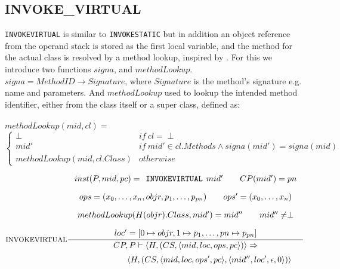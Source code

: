 \subsection{INVOKE\_VIRTUAL}
\label{app:invokevirtual}
\texttt{INVOKEVIRTUAL} is similar to \texttt{INVOKESTATIC} but in addition an object reference from the operand stack is stored as the first local variable, and the method for the actual class is resolved by a method lookup, inspired by \cite{dalvik}. For this we introduce two functions $signa$, and $methodLookup$. $signa = MethodID \to Signature$, where $Signature$ is the method's signature e.g. name and parameters. And $methodLookup$ used to lookup the intended method identifier, either from the class itself or a super class, defined as: \\\\
$methodLookup(mid, cl) = $ \vspace{-10px}
\[
\begin{cases}
  \perp & if\ cl = \perp \\
  mid'  & if\ mid' \in cl.Methods \wedge signa(mid') = signa (mid)  \\
  methodLookup(mid, cl.Class) & otherwise
\end{cases}
\]


$$\inference[INVOKEVIRTUAL]{
inst(P,mid,pc) = \texttt{INVOKEVIRTUAL }mid' \semsp 
CP(mid') = pn \semnl \\
ops = (x_0, \ldots, x_n, objr, p_1, \ldots, p_{pn}) \semsp
ops' = (x_0, \ldots, x_{n}) \semnl\\ 
methodLookup(H(objr).Class, mid') = mid'' \semsp
mid'' \neq \perp \semnl\\
loc' = [0 \mapsto objr, 1 \mapsto p_{1}, \ldots, pn \mapsto p_{pn}]
}
{CP, P \vdash \langle H, (CS, \langle mid, loc, ops, pc \rangle)\rangle \Rightarrow }$$
$$\hspace{130px}\langle H, (CS, \langle mid, loc, ops', pc \rangle, \langle mid'', loc', \epsilon, 0 \rangle)\rangle$$
